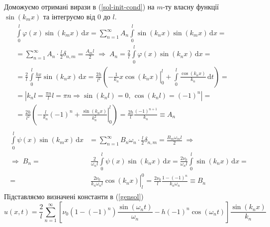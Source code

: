 \documentclass[a4paper, 14pt]{extreport}
\begin{document}
Доможуємо отримані вирази в (\ref{sol-init-cond}) на $m$-ту власну функції $\sin(k_m x)$ та інтегруємо від $0$ до $l$. 
\begin{equation*}
    \begin{aligned}
        \begin{aligned}
            &\int\limits_0^l \varphi(x) \sin(k_m x) \,\mathrm{d}x = \sum^{\infty}_{n=1} A_n \int\limits_0^l \sin(k_n x) \sin(k_m x) \,\mathrm{d}x =\\
            &= \sum^{\infty}_{n=1} A_n \cdot \frac{l}{2} \delta_{n,m} = \frac{A_m l}{2}
            \;\Rightarrow\;
            A_n = \frac{2}{l} \int\limits_0^l \varphi(x) \sin(k_n x) \,\mathrm{d}x =\\
            &= \frac{2}{l} \int\limits_0^l \frac{hx}{l} \sin(k_n x) \,\mathrm{d}x = \frac{2h}{l^2} \left(\left.-\frac{1}{k_n} x \cos(k_n x)\right|_0^l + \int\limits_0^l \frac{\cos(k_n x)}{k_n} \,\mathrm{d}t\right) =\\
            &= \left| k_n l = \frac{\pi n}{l} l = \pi n \Rightarrow \sin(k_n l) = 0,\, \cos(k_n l) = (-1)^n \right| =\\
            &= \frac{2h}{l^2} \left(-\frac{l}{k_n}(-1)^n + \left.\frac{\sin(k_n x)}{k_n^2}\right|_0^l \right) = \frac{2h}{l} \frac{(-1)^{n+1}}{k_n} \equiv A_n
        \end{aligned}\\
        \begin{aligned}
            \int\limits_0^l \psi(x) \sin(k_m x) \,\mathrm{d}x &= \sum^{\infty}_{n=1} B_n\omega_n \cdot \frac{l}{2} \delta_{n,m} = \frac{B_m \omega_m l}{2}
            \;\Rightarrow\\
            \Rightarrow\;
            B_n =&\ \frac{2}{\omega_n l} \int\limits_0^l \psi(x) \sin(k_n x) \,\mathrm{d}x = \frac{2\nu_0}{\omega_n l} \int\limits_0^l \sin(k_n x) \,\mathrm{d}x =\\
            =&\ \left.\frac{2\nu_0}{k_n\omega_n l} \cos(k_n x)\right|_l^0 = \frac{2\nu_0}{l} \frac{1 - (-1)^n}{k_n\omega_n} \equiv B_n
        \end{aligned}
    \end{aligned}
\end{equation*} 
Підставляємо визначені константи в (\ref{gensol})
\begin{equation} \label{sol3}
    u(x,t) = \frac{2}{l}\sum^{\infty}_{n=1} \left[\nu_0 (1 - (-1)^n)\frac{\sin(\omega_n t)}{\omega_n} - h(-1)^n\cos(\omega_n t)\right] \frac{\sin(k_n x)}{k_n}
\end{equation}
\end{document}
